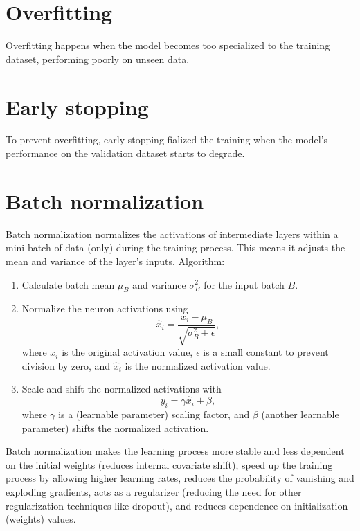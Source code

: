 \section{Overfitting}
Overfitting happens when the model becomes too specialized to the
training dataset, performing poorly on unseen data.

\section{Early stopping}
To prevent overfitting, early stopping fialized the training when the
model's performance on the validation dataset starts to degrade.

\section{Batch normalization}
Batch normalization normalizes the activations of intermediate layers
within a mini-batch of data (only) during the training process. This
means it adjusts the mean and variance of the layer's
inputs. Algorithm:
\begin{enumerate}
\item Calculate batch mean $\mu_B$ and variance $\sigma^2_B$ for the input batch $B$.
\item Normalize the neuron activations using
  \begin{equation}
    \hat{x}_i = \frac{x_i-\mu_B}{\sqrt{\sigma^2_B+\epsilon}},
  \end{equation}
  where $x_i$ is the original  activation value, $\epsilon$ is a small
  constant  to  prevent  division  by zero,  and  $\hat{x}_i$  is  the
  normalized activation value.
\item Scale and shift the normalized activations with
  \begin{equation}
    y_i = \gamma\hat{x}_i+\beta,
  \end{equation}
  where $\gamma$ is a (learnable parameter) scaling factor, and
  $\beta$ (another learnable parameter) shifts the normalized
  activation.
\end{enumerate}

Batch normalization makes the learning process more stable and less
dependent on the initial weights (reduces internal covariate shift),
speed up the training process by allowing higher learning rates,
reduces the probability of vanishing and exploding gradients, acts as
a regularizer (reducing the need for other regularization techniques
like dropout), and reduces dependence on initialization (weights)
values.

